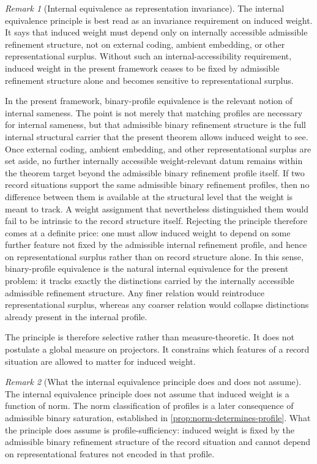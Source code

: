 \documentclass[11pt]{article}
\theoremstyle{remark}
\newtheorem{remark}{Remark}
\numberwithin{equation}{section}
\begin{document}
\begin{remark}[Internal equivalence as representation invariance]
The internal equivalence principle is best read as an invariance
requirement on induced weight. It says that induced weight must depend
only on internally accessible admissible refinement structure, not on
external coding, ambient embedding, or other representational
surplus. Without such an internal-accessibility requirement, induced
weight in the present framework ceases to be fixed by admissible
refinement structure alone and becomes sensitive to representational
surplus.

In the present framework, binary-profile equivalence is the relevant
notion of internal sameness. The point is not merely that matching
profiles are necessary for internal sameness, but that admissible
binary refinement structure is the full internal structural carrier
that the present theorem allows induced weight to see. Once external
coding, ambient embedding, and other representational surplus are set
aside, no further internally accessible weight-relevant datum remains
within the theorem target beyond the admissible binary refinement
profile itself. If two record situations support the same admissible
binary refinement profiles, then no difference between them is
available at the structural level that the weight is meant to track.
A weight assignment that nevertheless distinguished them would fail to
be intrinsic to the record structure itself. Rejecting the principle
therefore comes at a definite price: one must allow induced weight to
depend on some further feature not fixed by the admissible internal
refinement profile, and hence on representational surplus rather than
on record structure alone. In this sense, binary-profile equivalence
is the natural internal equivalence for the present problem: it tracks
exactly the distinctions carried by the internally accessible
admissible refinement structure. Any finer relation would reintroduce
representational surplus, whereas any coarser relation would collapse
distinctions already present in the internal profile.

The principle is therefore selective rather than measure-theoretic. It
does not postulate a global measure on projectors. It constrains which
features of a record situation are allowed to matter for induced
weight.
\end{remark}

\begin{remark}[What the internal equivalence principle does and does not assume]
The internal equivalence principle does not assume that induced weight is a function of norm. The norm classification of profiles is a later consequence of admissible binary saturation, established in \cref{prop:norm-determines-profile}. What the principle does assume is profile-sufficiency: induced weight is fixed by the admissible binary refinement structure of the record situation and cannot depend on representational features not encoded in that profile.
\end{remark}
\end{document}

